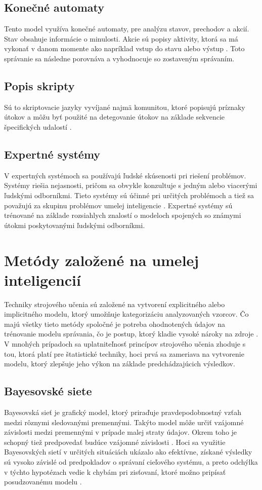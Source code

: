 \subsection*{Konečné automaty}
Tento model využíva konečné automaty, pre analýzu stavov, prechodov a akcií. Stav obsahuje informácie o minulosti. Akcie sú popisy aktivity, ktorá sa má vykonať v danom momente ako napríklad vstup do stavu alebo výstup \cite{AnomalyDetection}. Toto správanie sa následne porovnáva a vyhodnocuje so zostaveným správaním.

\subsection*{Popis skripty}
Sú to skriptovacie jazyky vyvíjané najmä komunitou, ktoré popisujú príznaky útokov a môžu byť použité na detegovanie útokov na základe sekvencie špecifických udalostí \cite{AnomalyDetection}.

\subsection*{Expertné systémy}
V expertných systémoch sa používajú ľudské skúsenosti pri riešení problémov. Systémy riešia nejasnosti, pričom sa obvykle konzultuje s jedným alebo viacerými ľudskými odborníkmi. Tieto systémy sú účinné pri určitých problémoch a tiež sa považujú za skupinu problémov umelej inteligencie \cite{Anomaly-Clarke-Yair}. Expertné systémy sú trénované na základe rozsiahlych znalostí o modeloch spojených so známymi útokmi poskytovanými ľudskými odborníkmi.

\section{Metódy založené na umelej inteligencií}
Techniky strojového učenia sú založené na vytvorení explicitného alebo implicitného modelu, ktorý umožňuje kategorizáciu analyzovaných vzorcov. Čo majú všetky tieto metódy spoločné je potreba ohodnotených údajov na trénovanie modelu správania, čo je postup, ktorý kladie vysoké nároky na zdroje \cite{AnomalyMarkovs}. V mnohých prípadoch sa uplatniteľnosť princípov strojového učenia zhoduje s tou, ktorá platí pre štatistické techniky, hoci prvá sa zameriava na vytvorenie modelu, ktorý zlepšuje jeho výkon na základe predchádzajúcich výsledkov.

\subsection*{Bayesovské siete}
Bayesovská sieť je grafický model, ktorý priraďuje pravdepodobnostný vzťah medzi rôznymi sledovanými premennými. Takýto model môže určiť vzájomné závislosti medzi premennými v prípade malej straty údajov. Okrem toho je schopný tiež predpovedať budúce vzájomné závislosti \cite{NIDS-Kumar}. Hoci sa využitie Bayesovských sietí v určitých situáciách ukázalo ako efektívne, získané výsledky sú vysoko závislé od predpokladov o správaní cieľového systému, a preto odchýlka v týchto hypotézach vedie k chybám pri zisťovaní, ktoré možno pripísať posudzovanému modelu \cite{AnomalyMarkovs}.

